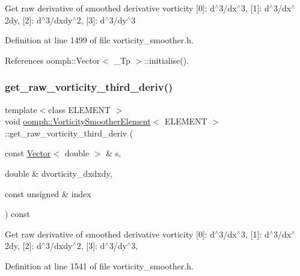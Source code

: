 Get raw derivative of smoothed derivative vorticity \mbox{[}0\mbox{]}\+: d$^\wedge$3/dx$^\wedge$3, \mbox{[}1\mbox{]}\+: d$^\wedge$3/dx$^\wedge$2dy, \mbox{[}2\mbox{]}\+: d$^\wedge$3/dxdy$^\wedge$2, \mbox{[}3\mbox{]}\+: d$^\wedge$3/dy$^\wedge$3 

Definition at line 1499 of file vorticity\+\_\+smoother.\+h.



References oomph\+::\+Vector$<$ \+\_\+\+Tp $>$\+::initialise().

\mbox{\label{classoomph_1_1VorticitySmootherElement_aea23c14dd7f145afe6a73eabf715e5df}} 
\subsubsection{\texorpdfstring{get\+\_\+raw\+\_\+vorticity\+\_\+third\+\_\+deriv()}{get\_raw\_vorticity\_third\_deriv()}\hspace{0.1cm}{\footnotesize\ttfamily [2/2]}}
{\footnotesize\ttfamily template$<$class E\+L\+E\+M\+E\+NT $>$ \\
void \hyperlink{classoomph_1_1VorticitySmootherElement}{oomph\+::\+Vorticity\+Smoother\+Element}$<$ E\+L\+E\+M\+E\+NT $>$\+::get\+\_\+raw\+\_\+vorticity\+\_\+third\+\_\+deriv (\begin{DoxyParamCaption}\item[{const \hyperlink{classoomph_1_1Vector}{Vector}$<$ double $>$ \&}]{s,  }\item[{double \&}]{dvorticity\+\_\+dxdxdy,  }\item[{const unsigned \&}]{index }\end{DoxyParamCaption}) const\hspace{0.3cm}{\ttfamily [inline]}}

Get raw derivative of smoothed derivative vorticity \mbox{[}0\mbox{]}\+: d$^\wedge$3/dx$^\wedge$3, \mbox{[}1\mbox{]}\+: d$^\wedge$3/dx$^\wedge$2dy, \mbox{[}2\mbox{]}\+: d$^\wedge$3/dxdy$^\wedge$2, \mbox{[}3\mbox{]}\+: d$^\wedge$3/dy$^\wedge$3, 

Definition at line 1541 of file vorticity\+\_\+smoother.\+h.



